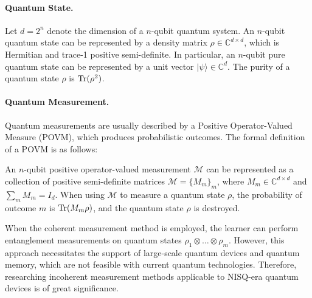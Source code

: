 \paragraph{Quantum State.} Let $ d = 2^n $ denote the dimension of a $n$-qubit quantum system. An $ n $-qubit quantum state can be represented by a density matrix $ \rho \in \mathbb{C}^{d \times d} $, which is Hermitian and trace-1 positive semi-definite. In particular, an $n$-qubit pure quantum state can be represented by a unit vector $|\psi \rangle \in \mathbb{C}^d$. The purity of a quantum state $\rho$ is $\mathrm{Tr}(\rho^2)$.




\paragraph{Quantum Measurement.} Quantum measurements are usually described by a Positive Operator-Valued Measure (POVM), which produces probabilistic outcomes. The formal definition of a POVM is as follows:

\begin{definition}
    An $n$-qubit positive operator-valued measurement $\mathcal{M}$ can be represented as a collection of positive semi-definite matrices $\mathcal{M} =\{M_m\}_m$, where $M_m \in \mathbb{C}^{d\times d}$ and $\sum_m M_m = I_d$. When using $\mathcal{M}$ to measure a quantum state $\rho$, the probability of outcome $m$ is $\mathrm{Tr}(M_m\rho)$, and the quantum state $\rho$ is destroyed.
\end{definition}

When the coherent measurement method is employed, the learner can perform entanglement measurements on quantum states $ \rho_1 \otimes \ldots \otimes \rho_m $. However, this approach necessitates the support of large-scale quantum devices and quantum memory, which are not feasible with current quantum technologies. Therefore, researching incoherent measurement methods applicable to NISQ-era quantum devices is of great significance. 




